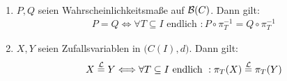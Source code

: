 \begin{satz}\label{satz7.5}\
	\begin{enumerate}[label=(\arabic*)]
		\item $P,Q$ seien Wahrscheinlichkeitsmaße auf $\mathcal{B}(C)$. Dann gilt:
		\begin{align*}
			P=Q\Longleftrightarrow\forall T\subseteq I\text{ endlich }: P\circ\pi_T^{-1}=Q\circ\pi_T^{-1}
		\end{align*}
		\item $X,Y$ seien Zufallsvariablen in $\big(C(I),d\big)$. Dann gilt:
		\begin{align*}
			X\overset{\mathcal{L}}{=}Y\Longleftrightarrow\forall T\subseteq I\text{ endlich }: \pi_T(X)\overset{\mathcal{L}}{=}\pi_T(Y)
		\end{align*}
	\end{enumerate}
\end{satz}

